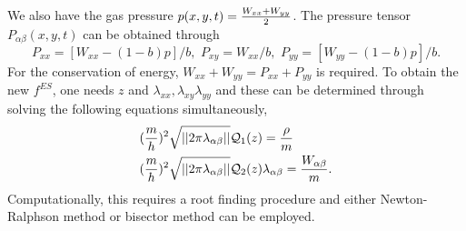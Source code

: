 \documentclass{rsproca}%
\begin{document}
We also have the gas pressure $p(x,y,t) = {W_{xx} + W_{yy} \over 2}$.  The pressure tensor $P_{\alpha \beta}(x,y,t)$ can be obtained through
\begin{equation}
P_{xx} = [W_{xx} - (1-b)p]/b, \,\, P_{xy} = W_{xx}/b, \,\, P_{yy} = [W_{yy} - (1-b)p]/b.
\end{equation}
For the conservation of energy, $W_{xx} +W_{yy} = P_{xx} + P_{yy}$ is required.
To obtain the new $f^{ES}$, one needs $z$ and $\lambda_{xx}, \lambda_{xy}\lambda_{yy}$ and these can be determined through solving the following equations simultaneously,
\begin{align}
&({m \over h})^2 \sqrt{||2 \pi \lambda_{\alpha \beta} ||}\mathcal{Q}_{1}(z) = {\rho \over m} \nonumber\\
&({m \over h})^2 \sqrt{||2 \pi \lambda_{\alpha \beta} ||}\mathcal{Q}_{2}(z) \lambda_{\alpha \beta}= {W_{\alpha \beta} \over m}.
\end{align}
Computationally, this requires a root finding procedure and either Newton-Ralphson method or bisector method can be employed.
\end{document}
